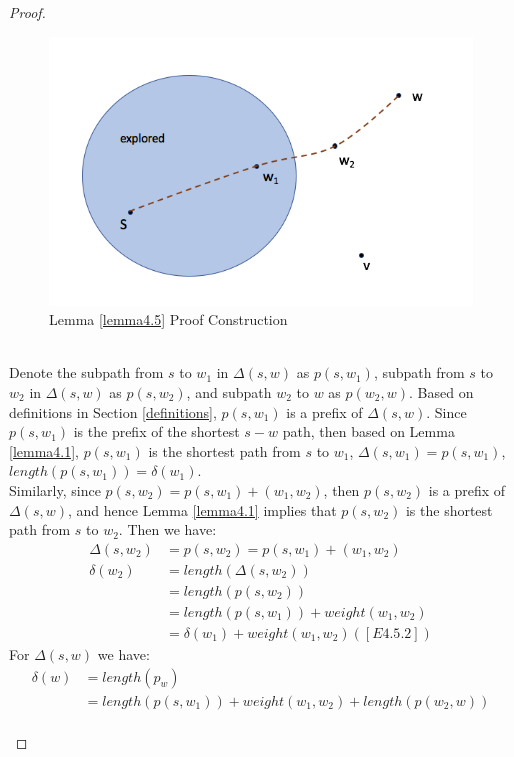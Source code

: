 \begin{proof}
\begin{itemize}
\begin{enumerate}
  \begin{figure}[H]
    \centering
    \includegraphics[scale = 0.55]{./figure/pic_proof.png}
    \caption{Lemma \ref{lemma4.5} Proof Construction}
    \label{figure1}
  \end{figure}
  \tab\\
  Denote the subpath from $s$ to $w_1$ in $\Delta(s, w)$ as $p(s, w_1)$, subpath from $s$ to $w_2$ in $\Delta(s, w)$ as $p(s, w_2)$, and subpath $w_2$ to $w$ as $p(w_2, w)$. Based on definitions in Section \ref{definitions}, $p(s, w_1)$ is a prefix of $\Delta(s, w)$. Since $p(s, w_1)$ is the prefix of the shortest $s-w$ path, then based on Lemma \ref{lemma4.1}, $p(s, w_1)$ is the shortest path from $s$ to $w_1$, $\Delta(s, w_1) = p(s, w_1)$, $length(p(s, w_1)) = \delta(w_1)$. 
  \\
  Similarly, since $p(s, w_2) = p(s, w_1) + (w_1, w_2)$, then $p(s, w_2)$ is a prefix of $\Delta(s, w)$, and hence Lemma \ref{lemma4.1} implies that $p(s, w_2)$ is the shortest path from $s$ to $w_2$. Then we have: 
  \begin{align*} 
      \Delta(s, w_2) &= p(s, w_2) = p(s, w_1) + (w_1, w_2) \\
      \delta(w_2) &= length(\Delta(s, w_2)) \\
                  &= length(p(s, w_2)) \\
                  &= length(p(s, w_1)) + weight(w_1, w_2)\\
                  &= \delta(w_1) + weight(w_1, w_2) ([E4.5.2])
  \end{align*}
  For $\Delta(s, w)$ we have: 
  \begin{align*}
    \delta(w) &= length(p_w) \\
              &= length(p(s, w_1)) + weight(w_1, w_2) + length(p(w_2, w)) \\

\end{align*}
\end{enumerate}
\end{itemize}
\end{proof}
